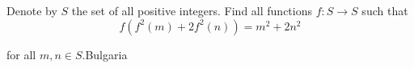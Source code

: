 Denote by $ S$ the set of all positive integers. Find all functions $ f: S \rightarrow S$ such that\[ f (f^2(m) + 2f^2(n)) = m^2 + 2 n^2\]

for all $ m,n \in S$.Bulgaria